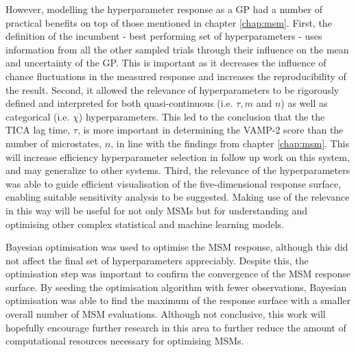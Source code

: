 However, modelling the hyperparameter response as a GP had a number of practical benefits on top of those mentioned in chapter \ref{chap:msm}. First, the definition of the incumbent -  best performing set of hyperparameters - uses information from all the other sampled trials through their influence on the mean and uncertainty of the GP. This is important as it decreases the influence of chance fluctuations in the measured response and increases the reproducibility of the result. Second, it allowed the relevance of hyperparameters to be rigorously defined and interpreted for both quasi-continuous (i.e. $\tau, m$ and $n$) as well as categorical (i.e. $\chi$) hyperparameters. This led to the conclusion that the the TICA lag time, $\tau$, is more important in determining the VAMP-2 score than the number of microstates, $n$, in line with the findings from chapter \ref{chap:msm}. This will increase efficiency hyperparameter selection in follow up work on this system, and may generalize to other systems.  Third, the relevance of the hyperparameters was able to guide efficient visualisation of the five-dimensional response surface, enabling suitable sensitivity analysis to be suggested. Making use of the relevance in this way will be useful for not only MSMs but for understanding and optimising other complex statistical and machine learning models.  

Bayesian optimisation was used to optimise the MSM response, although this did not affect the final set of hyperparameters appreciably. Despite this, the optimisation step was important to confirm the convergence of the MSM response surface. By seeding the optimisation algorithm with fewer observations, Bayesian optimisation was able to find the maximum of the response surface with a smaller overall number of MSM evaluations. Although not conclusive, this work will hopefully encourage further research in this area to further reduce the amount of computational resources necessary for optimising MSMs. 

